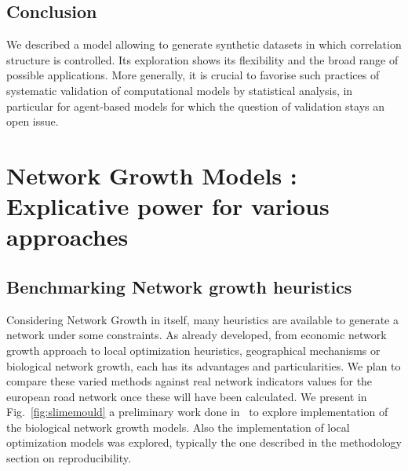 \subsection{Conclusion}


We described a model allowing to generate synthetic datasets in which correlation structure is controlled. Its exploration shows its flexibility and the broad range of possible applications. More generally, it is crucial to favorise such practices of systematic validation of computational models by statistical analysis, in particular for agent-based models for which the question of validation stays an open issue. 






\newpage

\section[Network Growth Models]{Network Growth Models : Explicative power for various approaches}

\subsection{Benchmarking Network growth heuristics}

Considering Network Growth in itself, many heuristics are available to generate a network under some constraints. As already developed, from economic network growth approach to local optimization heuristics, geographical mechanisms or biological network growth, each has its advantages and particularities. We plan to compare these varied methods against real network indicators values for the european road network once these will have been calculated. We present in Fig.~\ref{fig:slimemould} a preliminary work done in~\cite{raimbault2015labex} to explore implementation of the biological network growth models. Also the implementation of local optimization models was explored, typically the one described in the methodology section on reproducibility. 



